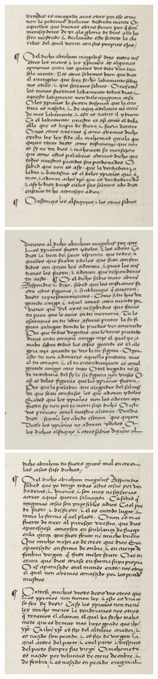 \includegraphics[width=0.5\textwidth]{HistoireIslamMediterranee/Images/DisputaFez6.png}
\includegraphics[width=0.5\textwidth]{HistoireIslamMediterranee/Images/DisputaFez7.png}
\includegraphics[width=0.5\textwidth]{HistoireIslamMediterranee/Images/DisputaFez8.png}
